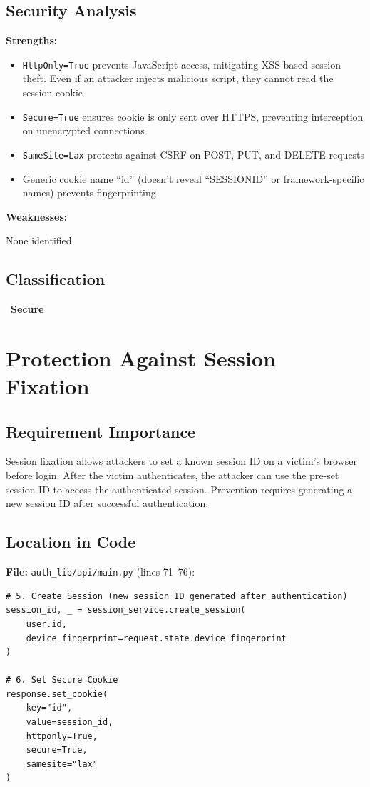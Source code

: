 \documentclass[11pt,a4paper]{article}
\newcommand{\secure}{\textcolor{securegreen}{\checkmark~\textbf{Secure}}}
\begin{document}
\subsection{Security Analysis}

\textbf{Strengths:}
\begin{itemize}[noitemsep]
    \item \texttt{HttpOnly=True} prevents JavaScript access, mitigating XSS-based session theft. Even if an attacker injects malicious script, they cannot read the session cookie
    \item \texttt{Secure=True} ensures cookie is only sent over HTTPS, preventing interception on unencrypted connections
    \item \texttt{SameSite=Lax} protects against CSRF on POST, PUT, and DELETE requests
    \item Generic cookie name ``id'' (doesn't reveal ``SESSIONID'' or framework-specific names) prevents fingerprinting
\end{itemize}

\textbf{Weaknesses:}

None identified.

\subsection{Classification}
\secure

\newpage
\section{Protection Against Session Fixation}

\subsection{Requirement Importance}
Session fixation allows attackers to set a known session ID on a victim's browser before login. After the victim authenticates, the attacker can use the pre-set session ID to access the authenticated session. Prevention requires generating a new session ID after successful authentication.

\subsection{Location in Code}

\textbf{File:} \texttt{auth\_lib/api/main.py} (lines 71--76):
\begin{lstlisting}
# 5. Create Session (new session ID generated after authentication)
session_id, _ = session_service.create_session(
    user.id, 
    device_fingerprint=request.state.device_fingerprint
)

# 6. Set Secure Cookie
response.set_cookie(
    key="id",
    value=session_id,
    httponly=True,
    secure=True,
    samesite="lax"
)
\end{lstlisting}
\end{document}
